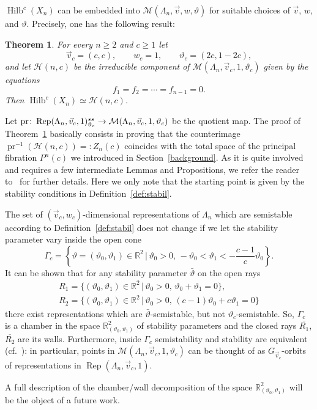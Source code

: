 \documentclass[11pt]{article}
\numberwithin{equation}{section}
\numberwithin{equation}{section}
\newtheorem{Theorem}{Theorem}[section]
\begin{document}
$\operatorname{Hilb}^c (X_n)$ can be embedded into $\mathcal{M} (\Lambda_n,\vec{v},w, \vartheta)$
for suitable choices of $\vec{v}$, $w$, and $\vartheta$. Precisely, one has the following result:
\begin{Theorem}\label{thm45}
For every $n\geq 2$ and $c\geq 1$ let
\[\vec{v}_c=(c,c) ,\qquad w_c = 1 ,\qquad \vartheta_c = (2c, 1-2c ),\]
and let
$\mathcal{H} (n,c) $ be the irreducible component of $\mathcal{M}(\Lambda_n,\vec{v}_c, 1, \vartheta_c) $
given by the equations
\begin{equation}\label{sliceeqs}
f_1 = f_2 = \cdots = f_{n-1} =0 .
\end{equation}
Then $\operatorname{Hilb}^c (X_n)\simeq \mathcal{H} (n,c) $.
\end{Theorem}
Let $\mbox{pr}\colon \operatorname{Rep}(\Lambda_n, \vec{v}_c, 1)^{\rm ss}_{\vartheta_c} \to \mathcal{M} (\Lambda_n,\vec{v}_c,1, \vartheta_c) $
be the quotient map. The proof {of Theorem~\ref{thm45} basically consists in proving that the counterimage
$\operatorname{pr}^{-1}(\mathcal{H} (n,c) )=:Z_n(c)$ coincides with the total space of the principal fibration $P^n(c)$ we introduced in Section~\ref{background}. As it is quite involved and requires a few intermediate Lemmas and Propositions, we refer the reader to~\cite{bblr} for further details.} Here we only note that the starting point is given by the stability conditions in Definition~\ref{def:stabil}.

\begin{Remark}The set of $(\vec{v}_c,w_c)$-dimensional representations of $\Lambda_n$ which are semistable according to Definition~\ref{def:stabil} does not change if we let the stability parameter vary inside the open cone
\[
 \Gamma_c=\left\{\vartheta=(\vartheta_0,\vartheta_1)\in\mathbb{R}^2\,|\,\vartheta_0>0,\, -\vartheta_0<\vartheta_1<-\frac{c-1}{c}\vartheta_0\right\} .
\]
It can be shown that
for any stability parameter $\bar{\vartheta}$ on the open rays
\begin{gather*}
 R_1 = \big\{(\vartheta_0,\vartheta_1)\in\mathbb{R}^2\,|\,\vartheta_0>0 ,\, \vartheta_0+\vartheta_1=0\big\} ,\\
 R_2 = \big\{(\vartheta_0,\vartheta_1)\in\mathbb{R}^2\,|\,\vartheta_0>0 ,\, (c-1)\vartheta_0+c\vartheta_1=0\big\}
\end{gather*}
there exist representations which are $\bar{\vartheta}$-semistable, but not $\vartheta_c$-semistable.
So, $ \Gamma_c$ is a chamber in the space
$\mathbb{R}^2_{(\vartheta_0,\vartheta_1)}$ of stability parameters and the closed rays $\overline{R_1}$, $\overline{R_2}$ are its walls. Furthermore, inside $\Gamma_c$ semistability and stability are equivalent (cf.~\cite[Lemma~4.7]{bblr}): in particular, points in $\mathcal{M} (\Lambda_n,\vec{v}_c,1, \vartheta_c)$ can be thought of as
$G_{\vec{v}_c}$-orbits of representations in $\operatorname{Rep}(\Lambda_n, \vec{v}_c, 1)$.

A full description of the chamber/wall decomposition of the space $\mathbb{R}^2_{(\vartheta_0,\vartheta_1)}$ will be the object of a future work.
\end{Remark}
\end{document}
